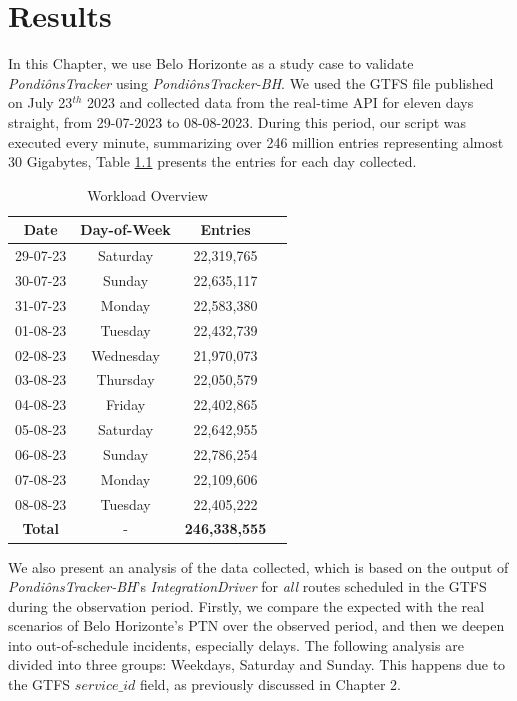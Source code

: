 \chapter{Results}
\label{cap5}

\vspace{-1.9cm}


In this Chapter, we use Belo Horizonte as a study case to validate \textit{PondiônsTracker} using
\textit{PondiônsTracker-BH}. We used the GTFS file published on July 23${^{th}}$ 2023 and collected
data from the real-time API for eleven days straight, from 29-07-2023 to 08-08-2023.
During this period, our script was executed every minute, summarizing over 246 million entries 
representing almost 30 Gigabytes, Table \ref{tab:entries} presents the entries for each day collected.

\begin{table}[h]
\centering
\caption{Workload Overview } 
\begin{tabular}{ |c|c|c|l| } 
\hline
Date & Day-of-Week & Entries \\
\hline
29-07-23& Saturday & 22,319,765 \\ 
\hline
30-07-23& Sunday & 22,635,117 \\ 
\hline
31-07-23& Monday & 22,583,380 \\ 
\hline
01-08-23& Tuesday & 22,432,739 \\ 
\hline
02-08-23& Wednesday & 21,970,073 \\ 
\hline
03-08-23& Thursday & 22,050,579 \\ 
\hline
04-08-23& Friday & 22,402,865 \\ 
\hline
05-08-23& Saturday & 22,642,955 \\ 
\hline
06-08-23& Sunday & 22,786,254 \\ 
\hline
07-08-23& Monday & 22,109,606 \\ 
\hline
08-08-23& Tuesday & 22,405,222 \\ 
\hline
\textbf{Total}& - & \textbf{246,338,555} \\ 
\hline
\end{tabular}
\label{tab:entries}
\end{table}


We also present an analysis of the data collected, which is based on the output of 
\textit{PondiônsTracker-BH}'s \textit{IntegrationDriver} for {\em all} routes scheduled in
the GTFS during the observation period. Firstly, we compare the expected with the real scenarios of Belo Horizonte's PTN over the observed period, and then we deepen into out-of-schedule incidents, especially delays. The following analysis are divided into three groups: Weekdays, Saturday and Sunday. This happens due to the GTFS $service\_id$ field, as previously discussed in Chapter 2.


